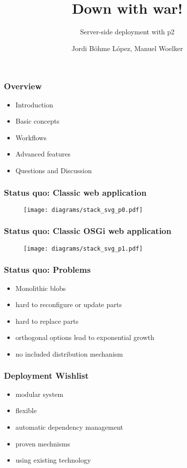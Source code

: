 \documentclass{beamer}
\author[Jordi Böhme López, Manuel Woelker]{Jordi Böhme López, Manuel Woelker}
\title[Down with war!\hspace{2em}\insertframenumber/\inserttotalframenumber]{Down with war!}
\subtitle{Server-side deployment with p2}
\begin{document}
\maketitle


\begin{frame}
  \frametitle{Overview}
  \begin{itemize}
  \item Introduction\pause
  \item Basic concepts\pause
  \item Workflows\pause
  \item Advanced features\pause
  \item Questions and Discussion
  \end{itemize}
\end{frame}


\begin{frame}
  \frametitle{Status quo: Classic web application}
\begin{figure}
   \texttt{[image: diagrams/stack\_svg\_p0.pdf]}
\end{figure}
\end{frame}

\begin{frame}
  \frametitle{Status quo: Classic OSGi web application}
\begin{figure}
   \texttt{[image: diagrams/stack\_svg\_p1.pdf]}
\end{figure}
\end{frame}

\begin{frame}
  \frametitle{Status quo: Problems}
  \begin{itemize}
  \item Monolithic blobs\pause
  \item hard to reconfigure or update parts\pause
  \item hard to replace parts\pause
  \item orthogonal options lead to exponential growth\pause
  \item no included distribution mechanism
  \end{itemize}   
\end{frame}

\begin{frame}
  \frametitle{Deployment Wishlist}
  \begin{itemize}
  \item modular system\pause
  \item flexible\pause
  \item automatic dependency management\pause
  \item proven mechnisms\pause
  \item using existing technology
  \end{itemize}   
\end{frame}
\end{document}
